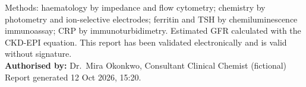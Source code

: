 \documentclass[9.5pt,a4paper]{extarticle}
\begin{document}
\vspace{0.5em}
{\footnotesize Methods: haematology by impedance and flow cytometry; chemistry by photometry and ion-selective
electrodes; ferritin and TSH by chemiluminescence immunoassay; CRP by immunoturbidimetry. Estimated GFR calculated with
the CKD-EPI equation. This report has been validated electronically and is valid without signature. \\
\textbf{Authorised by:} Dr.\ Mira Okonkwo, Consultant Clinical Chemist (fictional) \quad Report generated 12 Oct 2026, 15:20.}
\end{document}

